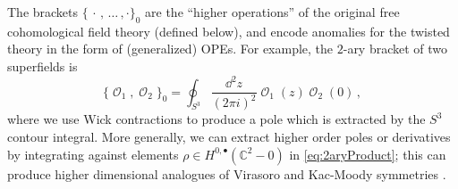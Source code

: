 \documentclass[11pt]{article}
\DeclareMathOperator{\calO}{\mathcal{O}}
\def\bbC{\mathbb{C}}
\begin{document}
The brackets $\{\,\cdot\,,\,\dots\,,\cdot\}_0$ are the ``higher operations'' of the original free cohomological field theory (defined below), and encode anomalies for the twisted theory in the form of (generalized) OPEs. For example, the $2$-ary bracket of two superfields is
\begin{equation}\label{eq:2aryProduct}
    \{\calO_1,\calO_2\}_0 = \oint_{S^3} \frac{\dd^2 z}{(2\pi i)^2} \calO_1(z)\!\calO_2(0)\,,
\end{equation}
where we use Wick contractions to produce a pole which is extracted by the $S^3$ contour integral. More generally, we can extract higher order poles or derivatives by integrating against elements $\rho \in H^{0,\bullet}(\bbC^2-0)$ in \eqref{eq:2aryProduct}; this can produce higher dimensional analogues of Virasoro and Kac-Moody symmetries \cite{faonte2019higher, Gwilliam:2018lpo, Saberi:2019fkq, Bomans:2023mkd, Budzik:2023xbr, Williams:2024mcc, Scheinpflug:2024mtn, Chen:2025ujx, Bomans:2025klo}.
\end{document}
